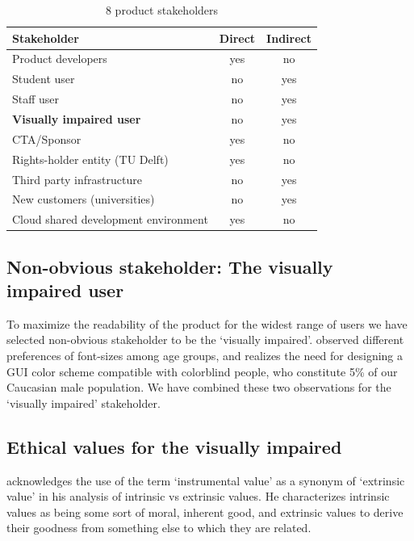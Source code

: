 \documentclass{article}
\begin{document}
\begin{table}
\centering
\begin{tabular}{||l c c ||} 
 \hline
 Stakeholder & Direct & Indirect \\
 \hline\hline
 Product developers & yes & no\\
 Student user & no & yes \\ 
 Staff user & no & yes \\
 \textbf{Visually impaired user} & no  & yes \\
 CTA/Sponsor & yes & no\\
 Rights-holder entity (TU Delft) & yes & no\\
 Third party infrastructure & no & yes  \\
 New customers (universities) & no & yes \\
 Cloud shared development environment & yes & no \\
 \hline
\end{tabular}
\caption{8 product stakeholders}
\label{stakeholdersTable}
\end{table}

\subsection{Non-obvious stakeholder: The visually impaired user\label{stakeholderMinority}}

To maximize the readability of the product for the widest range of users we have selected non-obvious stakeholder
to be the `visually impaired'. \textcite{Darroch2005} observed different preferences of font-sizes among age groups, and
\textcite{Hobbins2018} realizes the need for designing a GUI color scheme compatible with
colorblind people, who constitute 5{\%} of our Caucasian male population.
We have combined these two observations for the `visually impaired' stakeholder.

\subsection{Ethical values for the visually impaired \label{valuesMinority}}

\textcite{Zimmerman2019} acknowledges the use of the term `instrumental value' as a synonym of `extrinsic value' in his
analysis of intrinsic vs extrinsic values. He characterizes intrinsic values as
being some sort of moral, inherent good, and extrinsic values to derive their goodness from something else to which they are related.
\end{document}
